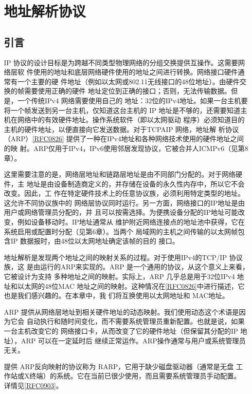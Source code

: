 \chapter{地址解析协议}

\section{引言}

IP 协议的设计目标是为跨越不同类型物理网络的分组交换提供互操作。这需要网络层软
件使用的地址和底层网络硬件使用的地址之间进行转换。网络接口硬件通常有一个主要的硬
件地址（例如以太网或802.11无线接口的48位地址）。由硬件交换的帧需要使用正确的硬件
地址定位到正确的接口；否则，无法传输数据。但是，一个传统IPv4 网络需要使用自己的
地址：32位的IPv4地址。如果一台主机要将一个帧发送到另一台主机，仅知道这台主机的
IP 地址是不够的，还需要知道主机在网络中的有效硬件地址。操作系统软件（即以太网驱动
程序）必须知道目的主机的硬件地址，以便直接向它发送数据。对于TCPAIP 网络，地址解
析协议（ARP）\href{https://www.rfc-editor.org/rfc/rfc0826}{[RFC0826]} 提供了一种在IPv4地址和各种网络技术使用的硬件地址之间的映
射。ARP仅用于IPv4，IPv6使用邻居发现协议，它被合并人ICMPv6（见第8章）。

这里需要注意的是，网络层地址和链路层地址是由不同部门分配的。对于网络硬件，主
地址是由设备制造商定义的，并存储在设备的永久性内存中，所以它不会改变。因此，工
作在特定硬件技术上的任意协议族，必须利用特定类型的地址。这允许不同协议族中的
网络层协议同时运行。另一方面，网络接口的IP地址是由用户或网络管理员分配的，并
且可以按需选择。为便携设备分配的IP地址可能改变，例如设备移动时。IP地址通常从
维护附近网络连接点的地址池中获得，它在系统启用或配置时分配（见第6章）。当两个
局域网的主机之间传输的以太网帧包含IP 数据报时，由48位以太网地址确定该帧的目的
接口。

地址解析是发现两个地址之间的映射关系的过程。对于使用IPv4的TCP/IP 协议族，这
是由运行的ARP来实现的。ARP 是一个通用的协议，从这个意义上来看，它被设计为支持
多种地址之间的映射。实际上，ARP 几乎总是用于32位IPv4 地址和以太网的48位MAC
地址之间的映射。这种情况在\href{https://www.rfc-editor.org/rfc/rfc0826}{[RFC0826]}中进行描述，它也是我们感兴趣的。在本章中，我
们将互换使用以太网地址和 MAC地址。

ARP 提供从网络层地址到相关硬件地址的动态映射。我们使用动态这个术语是因为它会
自动执行和随时间变化，而不需要系统管理员重新配置。也就是说，如果一台主机改变它的
网络接口卡，从而改变了它的硬件地址（但保留其分配的IP 地址），ARP 可以在一定延时后
继续正常运作。ARP操作通常与用户或系统管理员无关。

\begin{tcolorbox}
    提供 ARP反向映射的协议称为 RARP，它用于缺少磁盘驱动器（通常是无盘
    工作站或X终端）的系统。它在当前已很少使用，而且需要系统管理员手动配置。
    详情见\href{https://www.rfc-editor.org/rfc/rfc0903}{[RFC0903]}。
\end{tcolorbox}

